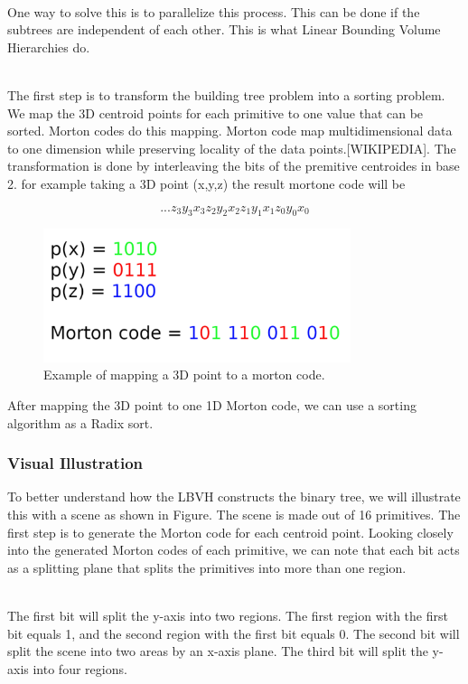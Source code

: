 \documentclass[11pt,a4paper]{article}
\begin{document}
\noindent
\\
One way to solve this is to parallelize this process. This can be done if the subtrees are independent of each other. This is what Linear Bounding Volume Hierarchies do.

\noindent
\\
The first step is to transform the building tree problem into a sorting problem. We map the 3D centroid points for each primitive to one value that can be sorted. Morton codes do this mapping. Morton code map multidimensional data to one dimension while preserving locality of the data points.[WIKIPEDIA]. The transformation is done by interleaving the bits of the premitive centroides in base 2. for example taking a 3D point (x,y,z) the result mortone code will be 

\begin{equation}
 ...z_3y_3x_3z_2y_2x_2z_1y_1x_1z_0y_0x_0
\end{equation}


\begin{figure}[h]	
     \centering
     \captionsetup{justification=centering,margin=2cm}
     \includegraphics[width=9cm]{images/z_curve.png}
     \caption{Example of mapping a 3D point to a morton code.}
     \label{fig:dice}
\end{figure}


After mapping the 3D point to one 1D Morton code, we can use a sorting algorithm as a Radix sort.

\subsubsection{Visual Illustration}
To better understand how the LBVH constructs the binary tree, we will illustrate this with a scene as shown in Figure. The scene is made out of 16 primitives. The first step is to generate the Morton code for each centroid point. Looking closely into the generated Morton codes of each primitive, we can note that each bit acts as a splitting plane that splits the primitives into more than one region. 

\noindent
\\
The first bit will split the y-axis into two regions. The first region with the first bit equals 1, and the second region with the first bit equals 0. The second bit will split the scene into two areas by an x-axis plane. The third bit will split the y-axis into four regions.
\end{document}
